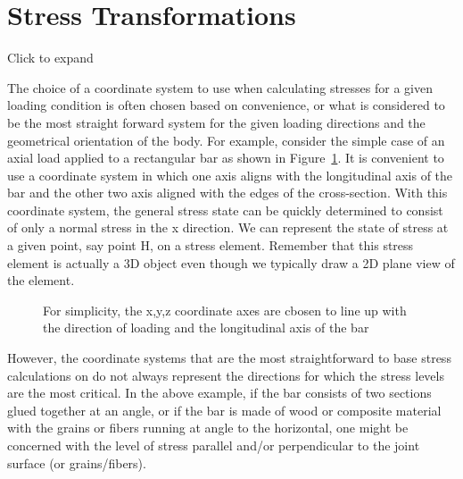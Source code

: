\documentclass[
  letterpaper,
  DIV=11,
  numbers=noendperiod]{scrreprt}
\theoremstyle{definition}
\theoremstyle{remark}
\begin{document}
\section{Stress Transformations}\label{sec-12.1}

Click to expand

The choice of a coordinate system to use when calculating stresses for a
given loading condition is often chosen based on convenience, or what is
considered to be the most straight forward system for the given loading
directions and the geometrical orientation of the body. For example,
consider the simple case of an axial load applied to a rectangular bar
as shown in Figure~\ref{fig-12.1}. It is convenient to use a coordinate
system in which one axis aligns with the longitudinal axis of the bar
and the other two axis aligned with the edges of the cross-section. With
this coordinate system, the general stress state can be quickly
determined to consist of only a normal stress in the x direction. We can
represent the state of stress at a given point, say point H, on a stress
element. Remember that this stress element is actually a 3D object even
though we typically draw a 2D plane view of the element.

\begin{figure}


\caption{\label{fig-12.1}For simplicity, the x,y,z coordinate axes are
cbosen to line up with the direction of loading and the longitudinal
axis of the bar}

\end{figure}%

However, the coordinate systems that are the most straightforward to
base stress calculations on do not always represent the directions for
which the stress levels are the most critical. In the above example, if
the bar consists of two sections glued together at an angle, or if the
bar is made of wood or composite material with the grains or fibers
running at angle to the horizontal, one might be concerned with the
level of stress parallel and/or perpendicular to the joint surface (or
grains/fibers).
\end{document}
